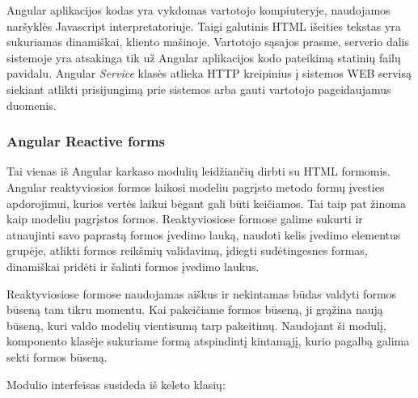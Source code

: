 \documentclass{VUMIFInfBakalaurinis}
\begin{document}
Angular aplikacijos kodas yra vykdomas vartotojo kompiuteryje, naudojamos naršyklės Javascript interpretatoriuje.
Taigi galutinis HTML išeities tekstas yra sukuriamas dinamiškai, kliento mašinoje. 
Vartotojo sąsajos prasme, serverio dalis sistemoje yra atsakinga tik už Angular aplikacijos kodo pateikimą statinių failų pavidalu.
Angular \emph{Service} klasės atlieka HTTP kreipinius į sistemos WEB servisą siekiant atlikti prisijungimą prie sistemos arba gauti vartotojo pageidaujamus duomenis.

\subsubsection{Angular Reactive forms}
Tai vienas iš Angular karkaso modulių leidžiančių dirbti su HTML formomis.
Angular reaktyviosios formos laikosi modeliu pagrįsto metodo formų įvesties apdorojimui, kurios vertės laikui bėgant gali būti keičiamos.
Tai taip pat žinoma kaip modeliu pagrįstos formos. Reaktyviosiose formose galime sukurti ir atnaujinti savo paprastą formos įvedimo lauką, naudoti kelis įvedimo elementus grupėje, 
atlikti formos reikšmių validavimą, įdiegti sudėtingesnes formas, dinamiškai pridėti ir šalinti formos įvedimo laukus.

Reaktyviosiose formose naudojamas aiškus ir nekintamas būdas valdyti formos būseną tam tikru momentu. Kai pakeičiame formos būseną, ji grąžina naują būseną, kuri valdo modelių vientisumą tarp pakeitimų.
Naudojant ši modulį, komponento klasėje sukuriame formą atspindintį kintamąjį, kurio pagalbą galima sekti formos būseną. 

Modulio interfeisas susideda iš keleto klasių: \cite{AngularRectiveForms}
\end{document}
